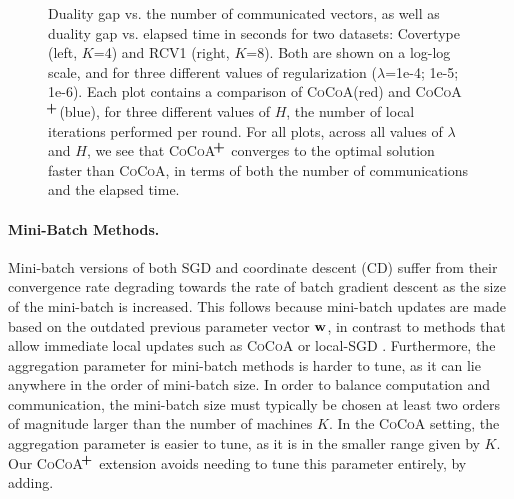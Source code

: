 \documentclass{article}
\newcommand{\cocoa}{\textsc{CoCoA}\xspace}
\newcommand{\cocoap}{\textsc{CoCoA$\!^{\bf \textbf{\footnotesize+}}$}\xspace}
\newcommand{\wv}{ {\bf w}}
\newcommand{\0}{ {\bf 0}}
\theoremstyle{plain}
\theoremstyle{definition}
\begin{document}
{%
\begin{figure*}[t!]
\vspace{-1.9em}
\caption{Duality gap vs. the number of communicated vectors, as well as duality gap vs. elapsed time in seconds for two datasets: Covertype (left, $K$=4) and RCV1 (right, $K$=8). Both are shown on a log-log scale, and for three different values of regularization ($\lambda$=1e-4; 1e-5; 1e-6). Each plot contains a comparison of \cocoa (red) and \cocoap (blue), for three different values of $H$, the number of local iterations performed per round. For all plots, across all values of $\lambda$ and $H$, we see that \cocoap converges to the optimal solution faster than \cocoa, in terms of both the number of communications and the elapsed time.
\vspace{-2mm}}
\label{fig:add_avg}
\end{figure*}




\vspace{-1em}
\paragraph{Mini-Batch Methods.}
Mini-batch versions of both SGD and coordinate descent (CD) \cite{richtarik2013distributed,NSync,MinibatchASDCA,Yang:2013vl, ALPHA, QUARTZ} suffer from their convergence rate degrading towards the rate of batch gradient descent as the size of the mini-batch is increased. 
This follows because mini-batch updates are made based on the outdated previous parameter vector $\wv$, in contrast to methods that allow immediate local updates such as \cocoa or local-SGD \cite{jaggi2014communication}.
Furthermore, the aggregation parameter for mini-batch methods is harder to tune, as it can lie anywhere in the order of mini-batch size.
In order to balance computation and communication, the mini-batch size must typically be chosen at least two orders of magnitude larger than the number of machines $K$.
In the \cocoa setting, the aggregation parameter is easier to tune, as it is in the smaller range given by $K$. 
Our \cocoap extension avoids needing to tune this parameter entirely, by adding.

}
\end{document}
